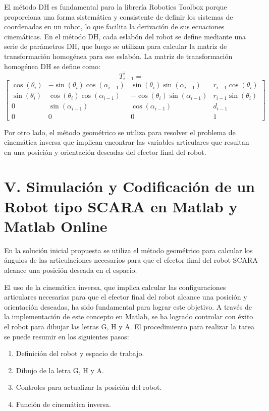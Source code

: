 \documentclass[final]{foresj}
\begin{document}
El método DH es fundamental para la librería Robotics Toolbox porque proporciona una forma sistemática y consistente de definir los sistemas de coordenadas en un robot, lo que facilita la derivación de sus ecuaciones cinemáticas. En el método DH, cada eslabón del robot se define mediante una serie de parámetros DH, que luego se utilizan para calcular la matriz de transformación homogénea para ese eslabón. La matriz de transformación homogénea DH se define como: 
\[
T_{i-1}^i =
\]
\[
\begin{bmatrix} \cos(\theta_i) & -\sin(\theta_i)\cos(\alpha_{i-1}) & \sin(\theta_i)\sin(\alpha_{i-1}) & r_{i-1}\cos(\theta_i) \\ \sin(\theta_i) & \cos(\theta_i)\cos(\alpha_{i-1}) & -\cos(\theta_i)\sin(\alpha_{i-1}) & r_{i-1}\sin(\theta_i) \\ 0 & \sin(\alpha_{i-1}) & \cos(\alpha_{i-1}) & d_{i-1} \\ 0 & 0 & 0 & 1 \end{bmatrix}
\]

Por otro lado, el método geométrico se utiliza para resolver el problema de cinemática inversa que implican encontrar las variables articulares que resultan en una posición y orientación deseadas del efector final del robot.

\section{V. Simulación y Codificación de un Robot tipo SCARA en Matlab y Matlab Online}

En la solución inicial propuesta se utiliza el método geométrico para calcular los ángulos de las articulaciones necesarios para que el efector final del robot SCARA alcance una posición deseada en el espacio.

El uso de la cinemática inversa, que implica calcular las configuraciones articulares necesarias para que el efector final del robot alcance una posición y orientación deseadas, ha sido fundamental para lograr este objetivo. A través de la implementación de este concepto en Matlab, se ha logrado controlar con éxito el robot para dibujar las letras G, H y A. El procedimiento para realizar la tarea se puede resumir en los siguientes pasos:

\begin{enumerate}
\item Definición del robot y espacio de trabajo.
\item Dibujo de la letra G, H y A.
\item Controles para actualizar la posición del robot.
\item Función de cinemática inversa.
\end{enumerate}
\end{document}
